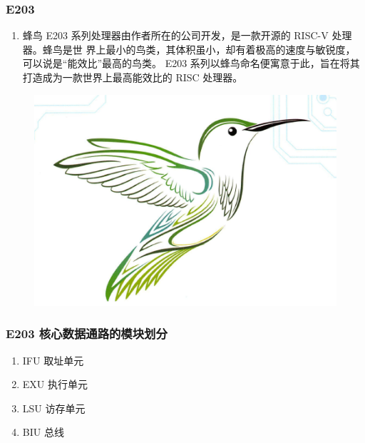 \documentclass[a4paper, 14pt, oneside]{book} %
\numberwithin{equation}{subsection}
\begin{document}
			\subsubsection{E203}
				\begin{enumerate}
					\item 
						蜂鸟 E203 系列处理器由作者所在的公司开发，是一款开源的 RISC-V 处理器。蜂鸟是世
						界上最小的鸟类，其体积虽小，却有着极高的速度与敏锐度，可以说是“能效比”最高的鸟类。
						E203 系列以蜂鸟命名便寓意于此，旨在将其打造成为一款世界上最高能效比的 RISC 处理器。
				\end{enumerate}	
				\begin{figure}[!htbp]
					\centering
					\includegraphics[scale=0.8]{img/four.png}
				\end{figure}
					
			\subsubsection{E203 核心数据通路的模块划分}
				\begin{enumerate}
					\item 
						IFU 取址单元
					\item 
						EXU 执行单元
					\item 
						LSU 访存单元
					\item 
						BIU 总线
				\end{enumerate}	
\end{document}

